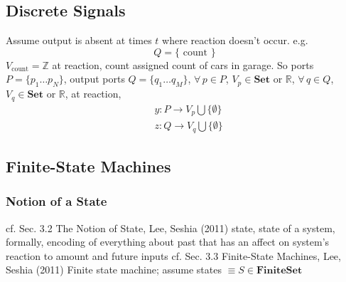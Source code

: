 \documentclass[10pt]{amsart}
\begin{document}
\begin{multicols*}{2}
\subsection{Discrete Signals}  
Assume output is absent at times $t$ where reaction doesn't occur.  
e.g. 
\[
Q = \lbrace \text{ count } \rbrace
\]
$V_{\text{count}} = \mathbb{Z}$  
at reaction, count assigned count of cars in garage.  
So ports $P=\lbrace p_1 \dots p_N \rbrace$, output ports $Q= \lbrace q_1 \dots q_M \rbrace$, $\forall \, p \in P$, $V_p \in \textbf{Set}$ or $\mathbb{R}$, $\forall \, q \in Q$, $V_q \in \textbf{Set}$ or $\mathbb{R}$, at reaction, 
\[
\begin{aligned}
& y: P \to V_p \bigcup \lbrace \emptyset \rbrace  \\ 
& z : Q \to V_q \bigcup \lbrace \emptyset \rbrace
\end{aligned}
\]
\subsection{Finite-State Machines}
\subsubsection{Notion of a State}  
cf. Sec. 3.2 The Notion of State, Lee, Seshia (2011) \cite{LeSe2011}
state, state of a system, formally, encoding of everything about past that has an affect on system's reaction to amount and future inputs  
cf. Sec. 3.3 Finite-State Machines, Lee, Seshia (2011) \cite{LeSe2011}  
Finite state machine; assume states $\equiv S \in \textbf{FiniteSet}$  

\end{multicols*}
\end{document}
